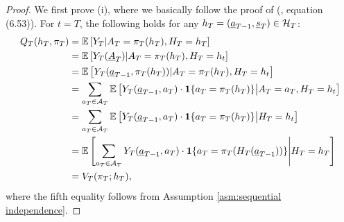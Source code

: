 \begin{proof}
    We first prove (i), where we basically follow the proof of \citeauthor{Tsiatis_et_al_2019} (\citeyear{Tsiatis_et_al_2019}, equation (6.53)). For $t=T$, the following holds for any $h_{T} = (\underline{a}_{T-1},\underline{s}_{T}) \in \mathcal{H}_{T}$:
    \begin{align}
        Q_{T}(h_{T},\pi_{T}) 
        &= \mathbb{E}\left[Y_{T}|A_{T}=\pi_{T}(h_{T}),H_{T}=h_T\right] \nonumber \\
        &= \mathbb{E}\left[Y_{T}(\underline{A}_{T})|A_{T}=\pi_{T}(h_{T}),H_{T}=h_{t}\right] \nonumber \\
        &= \mathbb{E}\left[Y_{T}(\underline{a}_{T-1},\pi_{T}(h_{T}))|A_{T}=\pi_{T}(h_{T}),H_{T}=h_{t}\right] \nonumber \\
        &= \sum_{a_{T} \in \mathcal{A}_{T}}\mathbb{E}\left[Y_{T}(\underline{a}_{T-1},a_{T}) \cdot \mathbf{1}\{a_{T} = \pi_{T}(h_{T})\}\middle|A_{T}=a_{T},H_{T}=h_{t}\right] \nonumber \\
         &= \sum_{a_{T} \in \mathcal{A}_{T}} \mathbb{E}\left[Y_{T}(\underline{a}_{T-1},a_{T}) \cdot \mathbf{1}\{a_{T} = \pi_{T}(h_{T})\}\middle|H_{T}=h_{t}\right] \nonumber \\
        &= \mathbb{E}\left[\sum_{a_{T} \in \mathcal{A}_{T}}Y_{T}(\underline{a}_{T-1},a_{T}) \cdot \mathbf{1}\{a_{T} = \pi_{T}(H_{T}(\underline{a}_{T-1}))\}\middle| H_{T}=h_{T}\right]  \nonumber \\
        &= V_{T}(\pi_{T};h_{T}), \label{eq:Q_T_V_T}
    \end{align}
    where the fifth equality follows from Assumption \ref{asm:sequential independence}. %
    

\end{proof}
